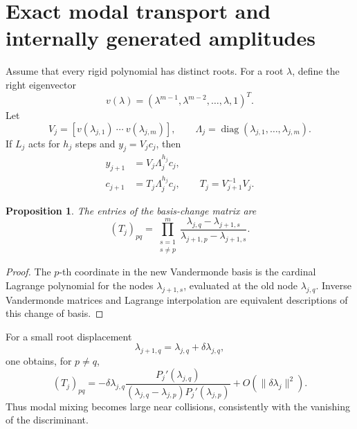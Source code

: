 \documentclass[11pt]{amsart}
\numberwithin{equation}{section}
\theoremstyle{plain}
\newtheorem{proposition}[theorem]{Proposition}
\theoremstyle{definition}
\theoremstyle{remark}
\begin{document}
\section{Exact modal transport and internally generated amplitudes}
\label{sec:modal_transport}

Assume that every rigid polynomial has distinct roots.  For a root $\lambda$, define the right eigenvector
\begin{equation}
v(\lambda)
=(\lambda^{m-1},\lambda^{m-2},\ldots,\lambda,1)^T.
\label{eq:companion_eigenvector}
\end{equation}
Let
\begin{equation}
V_j=
\left[
v(\lambda_{j,1})\ \cdots\ v(\lambda_{j,m})
\right],
\qquad
\Lambda_j=\operatorname{diag}(\lambda_{j,1},\ldots,\lambda_{j,m}).
\label{eq:modal_matrices}
\end{equation}
If $L_j$ acts for $h_j$ steps and $y_j=V_jc_j$, then
\begin{align}
y_{j+1}
&=V_j\Lambda_j^{h_j}c_j,
\label{eq:window_state_handoff}\\
c_{j+1}
&=T_j\Lambda_j^{h_j}c_j,
\qquad
T_j=V_{j+1}^{-1}V_j.
\label{eq:modal_transport}
\end{align}

\begin{proposition}
\label{prop:lagrange_transport}
The entries of the basis-change matrix are
\begin{equation}
(T_j)_{pq}
=
\prod_{\substack{s=1\\s\neq p}}^{m}
\frac{\lambda_{j,q}-\lambda_{j+1,s}}
{\lambda_{j+1,p}-\lambda_{j+1,s}}.
\label{eq:lagrange_transport_entries}
\end{equation}
\end{proposition}

\begin{proof}
The $p$-th coordinate in the new Vandermonde basis is the cardinal Lagrange polynomial for the nodes $\lambda_{j+1,s}$, evaluated at the old node $\lambda_{j,q}$.  Inverse Vandermonde matrices and Lagrange interpolation are equivalent descriptions of this change of basis.
\end{proof}

For a small root displacement
\begin{equation}
\lambda_{j+1,q}=\lambda_{j,q}+\delta\lambda_{j,q},
\label{eq:small_root_displacement}
\end{equation}
one obtains, for $p\neq q$,
\begin{equation}
(T_j)_{pq}
=-\delta\lambda_{j,q}
\frac{P_j'(\lambda_{j,q})}
{(\lambda_{j,q}-\lambda_{j,p})P_j'(\lambda_{j,p})}
+O(\|\delta\lambda_j\|^2).
\label{eq:offdiagonal_modal_mixing}
\end{equation}
Thus modal mixing becomes large near collisions, consistently with the vanishing of the discriminant.
\end{document}
